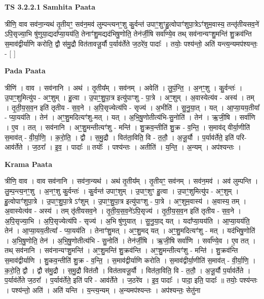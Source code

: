 \documentclass[17pt]{extarticle}
\begin{document}
\textbf{TS 3.2.2.1 } \newline
\textbf{Samhita Paata} \newline

त्रीणि॒ वाव सव॑ना॒न्यथ॑ तृ॒तीयꣳ॒॒ सव॑न॒मव॑ लुम्पन्त्यनꣳ॒॒शु कु॒र्वन्त॑ उपाꣳ॒॒शुꣳहु॒त्वोपाꣳ॑शुपा॒त्रेऽꣳ॑शुम॒वास्य॒ तन्तृ॑तीयसव॒ने॑ ऽपि॒सृज्या॒भि षु॑णुया॒द्यदा᳚प्या॒यय॑ति॒ तेनाꣳ॑शु॒मद्यद॑भिषु॒णोति॒ तेन॑र्जी॒षि सर्वा᳚ण्ये॒व तथ् सव॑नान्यꣳशु॒मन्ति॑ शु॒क्रव॑न्ति स॒माव॑द्वीर्याणि करोति॒ द्वौ स॑मु॒द्रौ वित॑तावजू॒र्यौ प॒र्याव॑र्तेते ज॒ठरे॑व॒ पादाः᳚ । तयोः॒ पश्य॑न्तो॒ अति॑ यन्त्य॒न्यमप॑श्यन्तः॒ - [  ] \newline

\textbf{Pada Paata} \newline

त्रीणि॑ । वाव । सव॑नानि । अथ॑ । तृ॒तीय᳚म् । सव॑नम् । अवेति॑ । लु॒पं॒न्ति॒ । अ॒नꣳ॒॒शु । कु॒र्वन्तः॑ । उ॒पाꣳ॒॒शुमित्यु॑प - अꣳ॒॒शुम् । हु॒त्वा । उ॒पाꣳ॒॒शु॒पा॒त्र इत्यु॑पाꣳशु - पा॒त्रे । अꣳ॒॒शुम् । अ॒वास्येत्य॑व - अस्य॑ । तम् । तृ॒ती॒य॒स॒व॒न इति॑ तृतीय - स॒व॒ने । अ॒पि॒सृज्येत्य॑पि - सृज्य॑ । अ॒भीति॑ । सु॒नु॒या॒त् । यत् । आ॒प्या॒यय॒तीया᳚ - प्या॒यय॑ति । तेन॑ । अꣳ॒॒शु॒मदित्यꣳ॑शु-मत् । यत् । अ॒भि॒षु॒णोतीत्य॑भि-सु॒नोति॑ । तेन॑ । ऋ॒जी॒षि । सर्वा॑णि । ए॒व । तत् । सव॑नानि । अꣳ॒॒शु॒मन्तीत्यꣳ॑शु - मन्ति॑ । शु॒क्रव॒न्तीति॑ शु॒क्र - व॒न्ति॒ । स॒माव॑द् वीर्या॒णीति॑ स॒माव॑त् - वी॒र्या॒णि॒ । क॒रो॒ति॒ । द्वौ । स॒मु॒द्रौ । वित॑ता॒विति॒ वि - त॒तौ॒ । अ॒जू॒र्यौ । प॒र्याव॑र्तेते॒ इति॑ परि-आव॑र्तेते । ज॒ठरा᳚ । इ॒व॒ । पादाः᳚ ॥ तयोः᳚ । पश्य॑न्तः । अतीति॑ । य॒न्ति॒ । अ॒न्यम् । अप॑श्यन्तः ।  \newline


\textbf{Krama Paata} \newline

त्रीणि॒ वाव । वाव सव॑नानि । सव॑ना॒न्यथ॑ । अथ॑ तृ॒तीय᳚म् । तृ॒तीयꣳ॒॒ सव॑नम् । सव॑न॒मव॑ । अव॑ लुम्पन्ति । लु॒म्प॒न्त्य॒नꣳ॒॒शु । अ॒नꣳ॒॒शु कु॒र्वन्तः॑ । कु॒र्वन्त॑ उपाꣳ॒॒शुम् । उ॒पाꣳ॒॒शुꣳ हु॒त्वा । उ॒पाꣳ॒॒शुमित्यु॑प - अꣳ॒॒शुम् । हु॒त्वोपाꣳ॑शुपा॒त्रे । उ॒पाꣳ॒॒शु॒पा॒त्रे ऽꣳ॑शुम् । उ॒पाꣳ॒॒शु॒पा॒त्र इत्यु॑पाꣳशु - पा॒त्रे । अꣳ॒॒शुम॒वास्य॑ । अ॒वास्य॒ तम् । अ॒वास्येत्य॑व - अस्य॑ । तम् तृ॑तीयसव॒ने । तृ॒ती॒य॒स॒व॒ने॑ऽपि॒सृज्य॑ । तृ॒ती॒य॒स॒व॒न इति॑ तृतीय - स॒व॒ने । अ॒पि॒सृज्या॒भि । अ॒पि॒सृज्येत्य॑पि - सृज्य॑ । अ॒भि षु॑णुयात् । सु॒नु॒या॒द् यत् । 
यदा᳚प्या॒यय॑ति । आ॒प्या॒यय॑ति॒ तेन॑ । आ॒प्या॒यय॒तीत्या᳚ - प्या॒यय॑ति । तेनाꣳ॑शु॒मत् । अꣳ॒॒शु॒मद् यत् । अꣳ॒॒शु॒मदित्यꣳ॑शु - मत् । यद॑भिषु॒णोति॑ । अ॒भि॒षु॒णोति॒ तेन॑ । अ॒भि॒॒षु॒णोतीत्य॑भि - सु॒नोति॑ । तेन॑र्जी॒षि । ऋ॒जी॒षि सर्वा॑णि । सर्वा᳚ण्ये॒व । ए॒व तत् । तथ् सव॑नानि । सव॑नान्यꣳशु॒मन्ति॑ । अꣳ॒॒शु॒मन्ति॑ शु॒क्रव॑न्ति । अꣳ॒॒शु॒मन्तीत्यꣳ॑शु - मन्ति॑ । शु॒क्रव॑न्ति स॒माव॑द्वीर्याणि । शु॒कव॒न्तीति॑ शु॒क्र - व॒न्ति॒ । स॒माव॑द्वीर्याणि करोति । स॒माव॑द्वीर्या॒णीति॑ स॒माव॑त् - वी॒र्या॒णि॒ । क॒रो॒ति॒ द्वौ । द्वौ स॑मु॒द्रौ । स॒मु॒द्रौ वित॑तौ । वित॑तावजू॒र्यौ । वित॑ता॒विति॒ वि - त॒तौ॒ । अ॒जू॒र्यौ प॒र्याव॑र्तेते । प॒र्याव॑र्तेते ज॒ठरा᳚ । प॒र्याव॑र्तेते॒ इति॑ परि - आव॑र्तेते । ज॒ठरे॑व । इ॒व॒ पादाः᳚ । पादा॒ इति॒ पादाः᳚ ॥ तयोः॒ पश्य॑न्तः । पश्य॑न्तो॒ अति॑ । अति॑ यन्ति । य॒न्त्य॒न्यम् । अ॒न्यमप॑श्यन्तः । अप॑श्यन्तः॒ सेतु॑ना \newline
\end{document}
